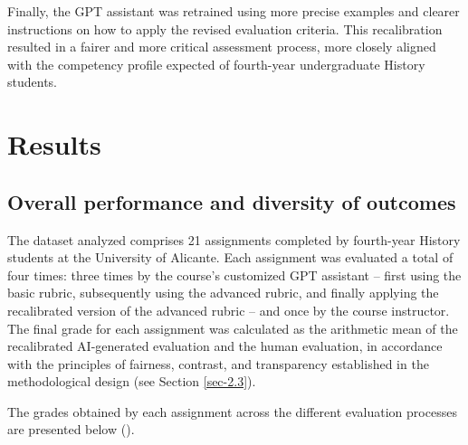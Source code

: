 \documentclass[english]{textolivre}
\begin{document}
Finally, the GPT assistant was retrained using more precise examples and clearer instructions on how to apply the revised evaluation criteria. This recalibration resulted in a fairer and more critical assessment process, more closely aligned with the competency profile expected of fourth-year undergraduate History students.

\section{Results}

\subsection{Overall performance and diversity of outcomes}
The dataset analyzed comprises 21 assignments completed by fourth-year History students at the University of Alicante. Each assignment was evaluated a total of four times: three times by the course’s customized GPT assistant -- first using the basic rubric, subsequently using the advanced rubric, and finally applying the recalibrated version of the advanced rubric -- and once by the course instructor. The final grade for each assignment was calculated as the arithmetic mean of the recalibrated AI-generated evaluation and the human evaluation, in accordance with the principles of fairness, contrast, and transparency established in the methodological design (see Section \ref{sec-2.3}).

The grades obtained by each assignment across the different evaluation processes are presented below ().
\end{document}
